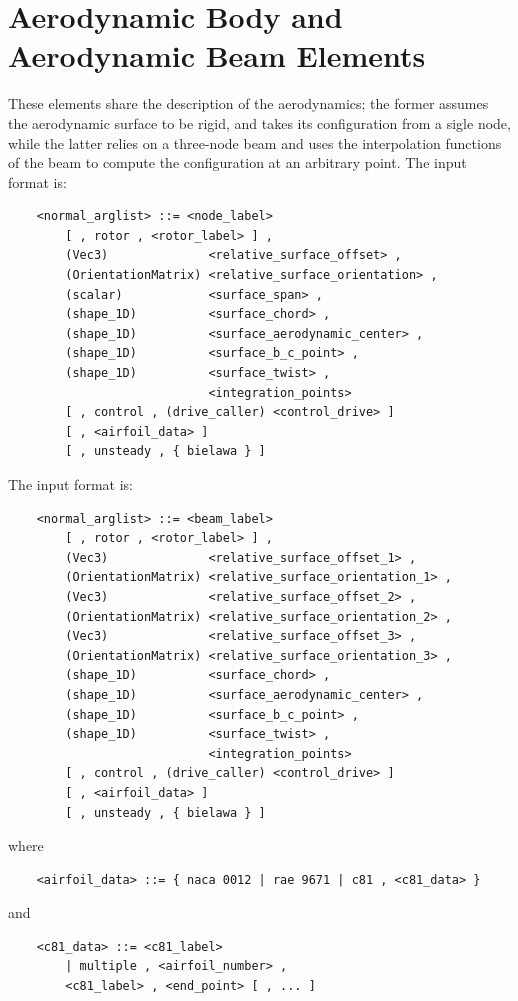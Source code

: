 \section{Aerodynamic Body and Aerodynamic Beam Elements}
These elements share the description of the aerodynamics; the former assumes
the aerodynamic surface to be rigid, and takes its configuration from a
sigle node, while the latter relies on a three-node beam and uses the
interpolation functions of the beam to compute the configuration at an 
arbitrary point.
The  input format is:
\begin{verbatim}
    <normal_arglist> ::= <node_label> 
        [ , rotor , <rotor_label> ] ,
        (Vec3)              <relative_surface_offset> , 
        (OrientationMatrix) <relative_surface_orientation> ,
        (scalar)            <surface_span> ,
        (shape_1D)          <surface_chord> ,
        (shape_1D)          <surface_aerodynamic_center> ,
        (shape_1D)          <surface_b_c_point> ,
        (shape_1D)          <surface_twist> ,
                            <integration_points>
        [ , control , (drive_caller) <control_drive> ] 
        [ , <airfoil_data> ]
        [ , unsteady , { bielawa } ]
\end{verbatim}
The  input format is:
\begin{verbatim}
    <normal_arglist> ::= <beam_label> 
        [ , rotor , <rotor_label> ] ,
        (Vec3)              <relative_surface_offset_1> ,       
        (OrientationMatrix) <relative_surface_orientation_1> ,
        (Vec3)              <relative_surface_offset_2> ,
        (OrientationMatrix) <relative_surface_orientation_2> ,
        (Vec3)              <relative_surface_offset_3> ,       
        (OrientationMatrix) <relative_surface_orientation_3> ,
        (shape_1D)          <surface_chord> ,
        (shape_1D)          <surface_aerodynamic_center> ,
        (shape_1D)          <surface_b_c_point> ,
        (shape_1D)          <surface_twist> ,
                            <integration_points>
        [ , control , (drive_caller) <control_drive> ] 
        [ , <airfoil_data> ]
        [ , unsteady , { bielawa } ]
\end{verbatim}
where
\begin{verbatim}
    <airfoil_data> ::= { naca 0012 | rae 9671 | c81 , <c81_data> }
\end{verbatim}
and
\begin{verbatim}
    <c81_data> ::= <c81_label> 
        | multiple , <airfoil_number> ,
        <c81_label> , <end_point> [ , ... ]
\end{verbatim}
